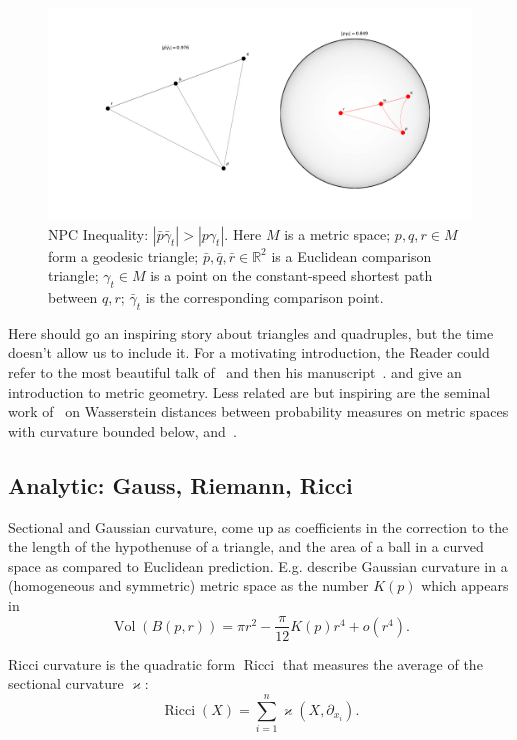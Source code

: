 \begin{figure}\centering
    \includegraphics[width=.85\linewidth]{art/triangle-comparison.pdf}
    \caption{NPC Inequality: \( |\bar{p}\bar{\gamma}_t| > |p\gamma_t| \).
    Here
        \( M \) is a metric space;
        \( p, q, r \in M \) form a geodesic triangle;
        \( \bar{p}, \bar{q}, \bar{r} \in \mathbb{R}^2 \) is a Euclidean comparison triangle;
        \( \gamma_t \in M \) is a point on the constant-speed shortest path between \( q, r \);
        \( \bar{\gamma}_t \) is the corresponding comparison point.
    }
\end{figure}

Here should go an inspiring story about triangles and quadruples, but the time
doesn't allow us to include it.
For a motivating introduction, the Reader could refer to the most beautiful
talk of~\citet{villaniTriangles} and then his manuscript~\cite{villaniOldNew}.
\citet{burago} and \citet{alexander} give an introduction to metric geometry.
Less related are but inspiring are the seminal work of~\citet{sturm} on Wasserstein
distances between probability measures on metric spaces with curvature bounded
below, and~\citet{le2017existence}.

\subsection*{Analytic: Gauss, Riemann, Ricci}

Sectional and Gaussian curvature, come up as coefficients in the correction to
the the length of the hypothenuse of a triangle, and the area of a ball in a
curved space as compared to Euclidean prediction.
E.g. \citet{burago} describe Gaussian curvature in a (homogeneous and
symmetric) metric space as the number \( K(p) \) which appears in
\[ \operatorname{Vol}(B(p, r)) = \pi r^2 - \frac{\pi}{12}K(p) r^4 + o(r^4). \]

Ricci curvature is the quadratic form \( \operatorname{Ricci} \) that measures
the average of the sectional curvature \( \varkappa \):
\[ \operatorname{Ricci}(X) = \sum_{i=1}^n \varkappa(X, \partial_{x_i}). \]

